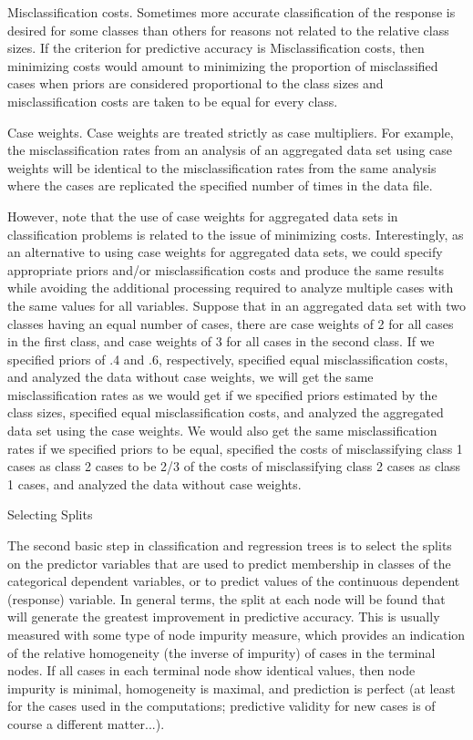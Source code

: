 Misclassification costs. Sometimes more accurate classification of the response is desired for some classes than others for reasons not related to the relative class sizes. If the criterion for predictive accuracy is Misclassification costs, then minimizing costs would amount to minimizing the proportion of misclassified cases when priors are considered proportional to the class sizes and misclassification costs are taken to be equal for every class.

Case weights. Case weights are treated strictly as case multipliers. For example, the misclassification rates from an analysis of an aggregated data set using case weights will be identical to the misclassification rates from the same analysis where the cases are replicated the specified number of times in the data file.

However, note that the use of case weights for aggregated data sets in classification problems is related to the issue of minimizing costs. Interestingly, as an alternative to using case weights for aggregated data sets, we could specify appropriate priors and/or misclassification costs and produce the same results while avoiding the additional processing required to analyze multiple cases with the same values for all variables. Suppose that in an aggregated data set with two classes having an equal number of cases, there are case weights of 2 for all cases in the first class, and case weights of 3 for all cases in the second class. If we specified priors of .4 and .6, respectively, specified equal misclassification costs, and analyzed the data without case weights, we will get the same misclassification rates as we would get if we specified priors estimated by the class sizes, specified equal misclassification costs, and analyzed the aggregated data set using the case weights. We would also get the same misclassification rates if we specified priors to be equal, specified the costs of misclassifying class 1 cases as class 2 cases to be 2/3 of the costs of misclassifying class 2 cases as class 1 cases, and analyzed the data without case weights.

Selecting Splits

The second basic step in classification and regression trees is to select the splits on the predictor variables that are used to predict membership in classes of the categorical dependent variables, or to predict values of the continuous dependent (response) variable. In general terms, the split at each node will be found that will generate the greatest improvement in predictive accuracy. This is usually measured with some type of node impurity measure, which provides an indication of the relative homogeneity (the inverse of impurity) of cases in the terminal nodes. If all cases in each terminal node show identical values, then node impurity is minimal, homogeneity is maximal, and prediction is perfect (at least for the cases used in the computations; predictive validity for new cases is of course a different matter...).

